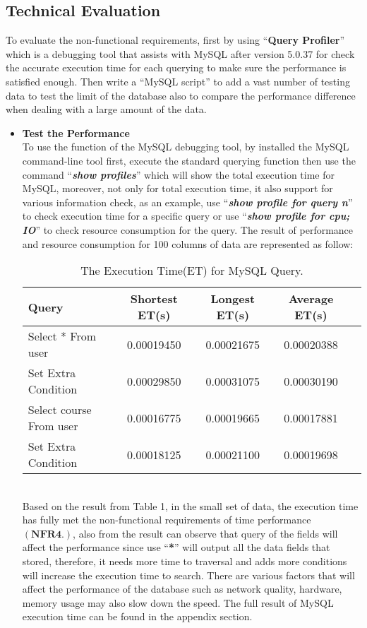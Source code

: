 \documentclass[12pt]{article}
\begin{document}
\subsection{Technical Evaluation}
To evaluate the non-functional requirements, first by using ``\textbf{Query Profiler}'' which is a debugging tool that assists with MySQL after version 5.0.37 for check the accurate execution time for each querying to make sure the performance is satisfied enough. Then write a ``MySQL script'' to add a vast number of testing data to test the limit of the database also to compare the performance difference when dealing with a large amount of the data.
\begin{itemize}
\item\textbf{Test the Performance}
\\To use the function of the MySQL debugging tool, by installed the MySQL command-line tool first, execute the standard querying function then use the command ``\textit{\textbf{show profiles}}'' which will show the total execution time for MySQL, moreover, not only for total execution time, it also support for various information check, as an example, use ``\textit{\textbf{show profile for query n}}'' to check execution time for a specific query or use ``\textit{\textbf{show profile for cpu; IO}}'' to check resource consumption for the query. The result of performance and resource consumption for 100 columns of data are represented as follow:
\begin{table}[h]
\centering
\begin{tabular}{|l|c|c|c|c|}\hline
Query&Shortest ET(s)&Longest ET(s)&Average ET(s)\\\hline
Select * From user&0.00019450&0.00021675&0.00020388\\
Set Extra Condition &0.00029850&0.00031075&0.00030190\\\hline
Select course From user&0.00016775&0.00019665&0.00017881\\
Set Extra Condition&0.00018125&0.00021100&0.00019698\\\hline
\end{tabular}
\caption{The Execution Time(ET) for MySQL Query.}
\label{tab:Margin_settings}
\end{table}
\\Based on the result from Table 1, in the small set of data, the execution time has fully met the non-functional requirements of time performance $\mathbf{(NFR4.)}$, also from the result can observe that query of the fields will affect the performance since use ``\textbf{*}'' will output all the data fields that stored, therefore, it needs more time to traversal and adds more conditions will increase the execution time to search. There are various factors that will affect the performance of the database such as network quality, hardware, memory usage may also slow down the speed. The full result of MySQL execution time can be found in the appendix section.

\end{itemize}
\end{document}
